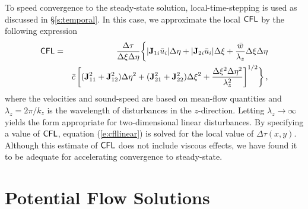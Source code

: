 To speed convergence to the steady-state solution, local-time-stepping is used
as discussed in \S\ref{s:temporal}.  In this case, we approximate the local
${\sf CFL}$ by the following expression
%
\begin{eqnarray} \label{e:cfllinear}
  {\sf CFL} &=& \frac{\Delta\tau}{\Delta\xi \Delta\eta}
           \biggl\{ |{\bf J}_{1i} \bar u_i| \Delta\eta + 
                  |{\bf J}_{2i} \bar u_i| \Delta\xi +  
                  \frac{\bar w}{\lambda_z} \Delta\xi \Delta\eta \nonumber \\
       & & \bar c \left[ ( {\bf J}_{11}^2 + {\bf J}_{12}^2 ) \Delta\eta^2 + 
                      ( {\bf J}_{21}^2 + {\bf J}_{22}^2 ) \Delta\xi^2  +
                      \frac{\Delta\xi^2\Delta\eta^2}{\lambda_z^2}
                  \right]^{1/2} \biggr\} {\, ,}
\end{eqnarray}
%
where the velocities and sound-speed are based on mean-flow quantities and
$\lambda_z = 2\pi/k_z$ is the wavelength of disturbances in the $z$-direction.
Letting $\lambda_z \rightarrow \infty$ yields the form appropriate for
two-dimensional linear disturbances.  By specifying a value of ${\sf CFL}$,
equation (\ref{e:cfllinear}) is solved for the local value of
$\Delta\tau(x,y)$.  Although this estimate of ${\sf CFL}$ does not include viscous
effects, we have found it to be adequate for accelerating convergence to
steady-state.

\section{Potential Flow Solutions \label{s:initial} }

